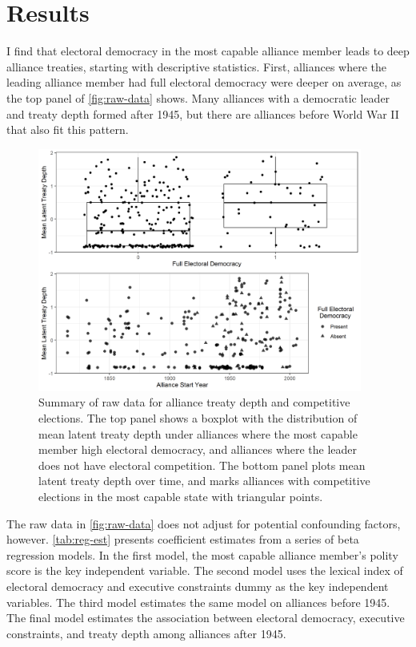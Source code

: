 \documentclass[12pt]{article}
\begin{document}
\section{Results}


I find that electoral democracy in the most capable alliance member leads to deep alliance treaties, starting with descriptive statistics. 
First, alliances where the leading alliance member had full electoral democracy were deeper on average, as the top panel of \autoref{fig:raw-data} shows. 
Many alliances with a democratic leader and treaty depth formed after 1945, but there are alliances before World War II that also fit this pattern. 

\begin{figure}[hbtp]
\centering
\includegraphics[width=0.95\textwidth]{../figures/raw-data.png}
\caption{Summary of raw data for alliance treaty depth and competitive elections. The top panel shows a boxplot with the distribution of mean latent treaty depth under alliances where the most capable member high electoral democracy, and alliances where the leader does not have electoral competition. The bottom panel plots mean latent treaty depth over time, and marks alliances with competitive elections in the most capable state with triangular points. }
\label{fig:raw-data}
\end{figure}


The raw data in \autoref{fig:raw-data} does not adjust for potential confounding factors, however. 
\autoref{tab:reg-est} presents coefficient estimates from a series of beta regression models. 
In the first model, the most capable alliance member's polity score is the key independent variable. 
The second model uses the lexical index of electoral democracy and executive constraints dummy as the key independent variables.  
The third model estimates the same model on alliances before 1945. 
The final model estimates the association between electoral democracy, executive constraints, and treaty depth among alliances after 1945. 
\end{document}
